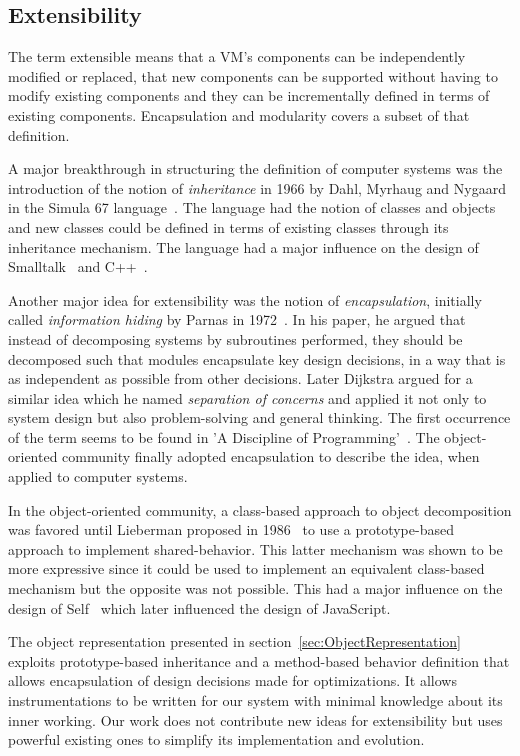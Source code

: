 \subsection{Extensibility}

The term extensible means that a VM's components can be independently modified or
replaced, that new components can be supported without having to modify
existing components and they can be incrementally defined in terms of existing
components. Encapsulation and modularity covers a subset of that definition. 

A major breakthrough in structuring the definition of computer systems was the
introduction of the notion of \textit{inheritance} in 1966 by Dahl, Myrhaug and
Nygaard in the Simula 67 language~\cite{Dahl:1968}. The language had the notion
of classes and objects and new classes could be defined in terms of existing
classes through its inheritance mechanism. The language had a major influence on
the design of Smalltalk~\cite{Kay:1993} and C++~\cite{Stroustrup:2007}.

Another major idea for extensibility was the notion of \textit{encapsulation},
initially called \textit{information hiding} by Parnas in
1972~\cite{Parnas:1972}. In his paper, he argued that instead of decomposing
systems by subroutines performed, they should be decomposed such that modules
encapsulate key design decisions, in a way that is as independent as possible
from other decisions.  Later Dijkstra argued for a similar idea which he named
\textit{separation of concerns} and applied it not only to system design but
also problem-solving and general thinking. The first occurrence of the term
seems to be found in 'A Discipline of Programming'~\cite{dijkstra:1976}. The
object-oriented community finally adopted encapsulation to describe the idea,
when applied to computer systems.

In the object-oriented community, a class-based approach to object
decomposition was favored until Lieberman proposed in
1986~\cite{Lieberman:1986} to use a prototype-based approach to implement
shared-behavior. This latter mechanism was shown to be more expressive since it
could be used to implement an equivalent class-based mechanism but the opposite
was not possible. This had a major influence on the design of
Self~\cite{Ungar:1987} which later influenced the design of JavaScript.

The object representation presented in section~\ref{sec:ObjectRepresentation}
exploits prototype-based inheritance and a method-based behavior definition
that allows encapsulation of design decisions made for optimizations. It allows
instrumentations to be written for our system with minimal knowledge about its
inner working. Our work does not contribute new ideas for extensibility but
uses powerful existing ones to simplify its implementation and evolution.

